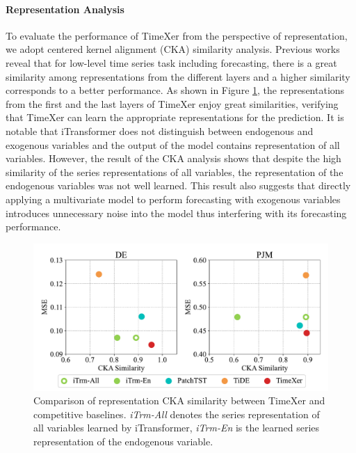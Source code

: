 \documentclass[nohyperref]{article}
\theoremstyle{plain}
\theoremstyle{definition}
\theoremstyle{remark}
\begin{document}
\paragraph{Representation Analysis} To evaluate the performance of TimeXer from the perspective of representation, we adopt centered kernel alignment (CKA) similarity \cite{kornblith2019similarity} analysis. Previous works \cite{wu2023timesnet, dong2023simmtm} 
reveal that for low-level time series task including forecasting, there is a great similarity among representations from the different layers and a higher similarity corresponds to a better performance. As shown in Figure \ref{fig:cka}, the representations from the first and the last layers of TimeXer enjoy great similarities, verifying that TimeXer can learn the appropriate representations for the prediction. It is notable that iTransformer does not distinguish between endogenous and exogenous variables and the output of the model contains representation of all variables. However, the result of the CKA analysis shows that despite the high similarity of the series representations of all variables, the representation of the endogenous variables was not well learned. This result also suggests that directly applying a multivariate model to perform forecasting with exogenous variables introduces unnecessary noise into the model thus interfering with its forecasting performance.

\begin{figure}[h]
    \vspace{-10pt}
    \centering
    \includegraphics[width=\linewidth]{fig/cka_2.pdf}
    \vspace{-20pt}
    \caption{Comparison of representation CKA similarity between TimeXer and competitive baselines. \emph{iTrm-All} denotes the series representation of all variables learned by iTransformer, \emph{iTrm-En} is the learned series representation of the endogenous variable.}
    \label{fig:cka}
    \vspace{-15pt}
\end{figure}
\end{document}
